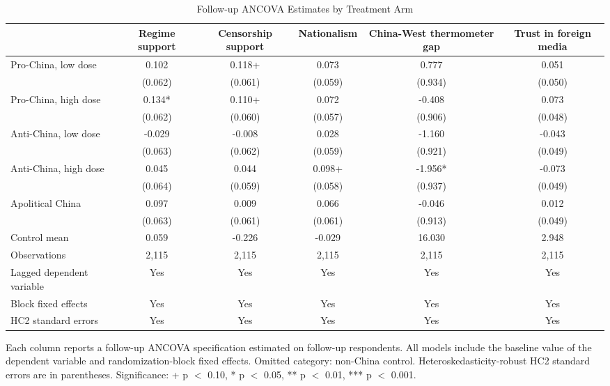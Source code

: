 \begin{table}[H]
\centering
\caption{Follow-up ANCOVA Estimates by Treatment Arm}
\label{tab:main_ancova_t2}
\footnotesize
\begin{threeparttable}
\begin{tabular}{lccccc}
\toprule
 & Regime support & Censorship support & Nationalism & China-West thermometer gap & Trust in foreign media \\
\midrule
Pro-China, low dose & 0.102 & 0.118+ & 0.073 & 0.777 & 0.051 \\
 & (0.062) & (0.061) & (0.059) & (0.934) & (0.050) \\
\addlinespace
Pro-China, high dose & 0.134* & 0.110+ & 0.072 & -0.408 & 0.073 \\
 & (0.062) & (0.060) & (0.057) & (0.906) & (0.048) \\
\addlinespace
Anti-China, low dose & -0.029 & -0.008 & 0.028 & -1.160 & -0.043 \\
 & (0.063) & (0.062) & (0.059) & (0.921) & (0.049) \\
\addlinespace
Anti-China, high dose & 0.045 & 0.044 & 0.098+ & -1.956* & -0.073 \\
 & (0.064) & (0.059) & (0.058) & (0.937) & (0.049) \\
\addlinespace
Apolitical China & 0.097 & 0.009 & 0.066 & -0.046 & 0.012 \\
 & (0.063) & (0.061) & (0.061) & (0.913) & (0.049) \\
\addlinespace
\midrule
Control mean & 0.059 & -0.226 & -0.029 & 16.030 & 2.948 \\
Observations & 2,115 & 2,115 & 2,115 & 2,115 & 2,115 \\
Lagged dependent variable & Yes & Yes & Yes & Yes & Yes \\
Block fixed effects & Yes & Yes & Yes & Yes & Yes \\
HC2 standard errors & Yes & Yes & Yes & Yes & Yes \\
\bottomrule
\end{tabular}
\begin{tablenotes}[flushleft]
\footnotesize
\item Each column reports a follow-up ANCOVA specification estimated on follow-up respondents. All models include the baseline value of the dependent variable and randomization-block fixed effects. Omitted category: non-China control. Heteroskedasticity-robust HC2 standard errors are in parentheses. Significance: + p $<$ 0.10, * p $<$ 0.05, ** p $<$ 0.01, *** p $<$ 0.001.
\end{tablenotes}
\end{threeparttable}
\end{table}
